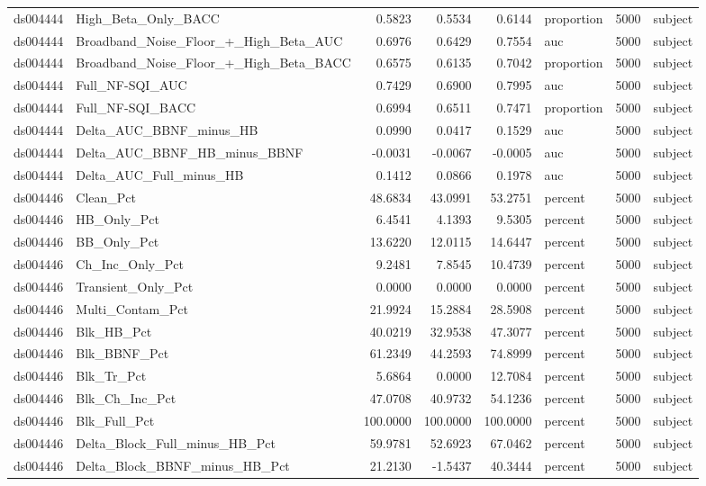 \begin{tabular}{llrrrlrl}
ds004444 & High_Beta_Only_BACC & 0.5823 & 0.5534 & 0.6144 & proportion & 5000 & subject \\
ds004444 & Broadband_Noise_Floor_+_High_Beta_AUC & 0.6976 & 0.6429 & 0.7554 & auc & 5000 & subject \\
ds004444 & Broadband_Noise_Floor_+_High_Beta_BACC & 0.6575 & 0.6135 & 0.7042 & proportion & 5000 & subject \\
ds004444 & Full_NF-SQI_AUC & 0.7429 & 0.6900 & 0.7995 & auc & 5000 & subject \\
ds004444 & Full_NF-SQI_BACC & 0.6994 & 0.6511 & 0.7471 & proportion & 5000 & subject \\
ds004444 & Delta_AUC_BBNF_minus_HB & 0.0990 & 0.0417 & 0.1529 & auc & 5000 & subject \\
ds004444 & Delta_AUC_BBNF_HB_minus_BBNF & -0.0031 & -0.0067 & -0.0005 & auc & 5000 & subject \\
ds004444 & Delta_AUC_Full_minus_HB & 0.1412 & 0.0866 & 0.1978 & auc & 5000 & subject \\
ds004446 & Clean_Pct & 48.6834 & 43.0991 & 53.2751 & percent & 5000 & subject \\
ds004446 & HB_Only_Pct & 6.4541 & 4.1393 & 9.5305 & percent & 5000 & subject \\
ds004446 & BB_Only_Pct & 13.6220 & 12.0115 & 14.6447 & percent & 5000 & subject \\
ds004446 & Ch_Inc_Only_Pct & 9.2481 & 7.8545 & 10.4739 & percent & 5000 & subject \\
ds004446 & Transient_Only_Pct & 0.0000 & 0.0000 & 0.0000 & percent & 5000 & subject \\
ds004446 & Multi_Contam_Pct & 21.9924 & 15.2884 & 28.5908 & percent & 5000 & subject \\
ds004446 & Blk_HB_Pct & 40.0219 & 32.9538 & 47.3077 & percent & 5000 & subject \\
ds004446 & Blk_BBNF_Pct & 61.2349 & 44.2593 & 74.8999 & percent & 5000 & subject \\
ds004446 & Blk_Tr_Pct & 5.6864 & 0.0000 & 12.7084 & percent & 5000 & subject \\
ds004446 & Blk_Ch_Inc_Pct & 47.0708 & 40.9732 & 54.1236 & percent & 5000 & subject \\
ds004446 & Blk_Full_Pct & 100.0000 & 100.0000 & 100.0000 & percent & 5000 & subject \\
ds004446 & Delta_Block_Full_minus_HB_Pct & 59.9781 & 52.6923 & 67.0462 & percent & 5000 & subject \\
ds004446 & Delta_Block_BBNF_minus_HB_Pct & 21.2130 & -1.5437 & 40.3444 & percent & 5000 & subject \\

\end{tabular}
